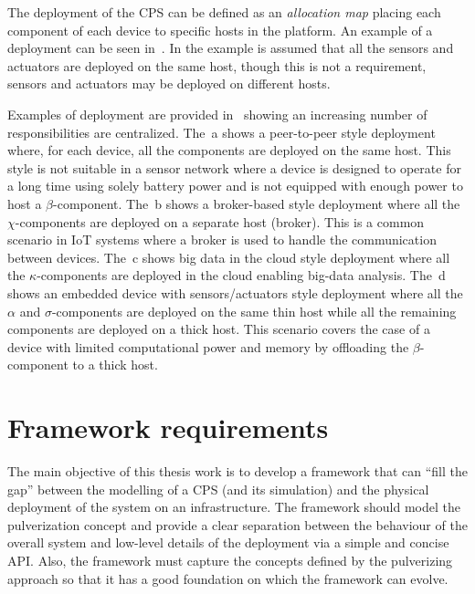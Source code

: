 The deployment of the CPS can be defined as an \emph{allocation map} placing each component of each device to specific hosts in the platform.
An example of a deployment can be seen in~. In the example is assumed that all the sensors and actuators are deployed on the
same host, though this is not a requirement, sensors and actuators may be deployed on different hosts.

Examples of deployment are provided in~ showing an increasing number of responsibilities are centralized.
The~a shows a peer-to-peer style deployment where, for each device, all the components are deployed on the same host.
This style is not suitable in a sensor network where a device is designed to operate for a long time using solely battery power and is not equipped
with enough power to host a $\beta$-component.
The~b shows a broker-based style deployment where all the $\chi$-components are deployed on a separate host (broker).
This is a common scenario in IoT systems where a broker is used to handle the communication between devices.
The~c shows big data in the cloud style deployment where all the $\kappa$-components are deployed in the cloud
enabling big-data analysis.
The~d shows an embedded device with sensors/actuators style deployment where all the $\alpha$ and $\sigma$-components
are deployed on the same thin host while all the remaining components are deployed on a thick host. This scenario covers the case of a device
with limited computational power and memory by offloading the $\beta$-component to a thick host.


\section{Framework requirements}
\label{sec:framework-requirements}

The main objective of this thesis work is to develop a framework that can ``fill the gap'' between the modelling of a CPS (and its simulation) and
the physical deployment of the system on an infrastructure.
The framework should model the pulverization concept and provide a clear separation between the behaviour of the overall system and low-level
details of the deployment via a simple and concise API.
Also, the framework must capture the concepts defined by the pulverizing approach so that it has a good foundation on which the framework can
evolve.


